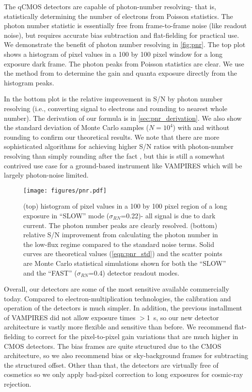 The qCMOS detectors are capable of photon-number resolving- that is, statistically determining the number of electrons from Poisson statistics. The photon number statistic is essentially free from frame-to-frame noise (like readout noise), but requires accurate bias subtraction and flat-fielding for practical use. We demonstrate the benefit of photon number resolving in \autoref{fig:pnr}. The top plot shows a histogram of pixel values in a 100 by 100 pixel window for a long exposure dark frame. The photon peaks from Poisson statistics are clear. We use the method from \citet{starkey_determining_2016} to determine the gain and quanta exposure directly from the histogram peaks. 

In the bottom plot is the relative improvement in S/N by photon number resolving (i.e., converting signal to electrons and rounding to nearest whole number). The derivation of our formula is in \autoref{sec:pnr_derivation}. We also show the standard deviation of Monte Carlo samples ($N=10^4$) with and without rounding to confirm our theoretical results. We note that there are more sophisticated algorithms for achieving higher S/N ratios with photon-number resolving than simply rounding after the fact \citep{harpsoe_bayesian_2012}, but this is still a somewhat contrived use case for a ground-based instrument like VAMPIRES which will be largely photon-noise limited.

\begin{figure}
    \centering
    \texttt{[image: figures/pnr.pdf]}
    \caption{(top) histogram of pixel values in a 100 by 100 pixel region of a long exposure in ``SLOW'' mode ($\sigma_{RN}$=\SI{0.22}{\electron})- all signal is due to dark current. The photon number peaks are clearly resolved. (bottom) relative S/N improvement from calculating the photon number in the low-flux regime compared to the standard noise terms. Solid curves are theoretical values (\autoref{eqn:pnr_std}) and the scatter points are Monte Carlo statistical simulations shown for both the ``SLOW'' and the ``FAST''  ($\sigma_{RN}$=\SI{0.4}{\electron}) detector readout modes.\label{fig:pnr}}
\end{figure}

Overall, our detectors are some of the most sensitive available commercially today. Compared to electron-multiplication technologies, the calibration and operation of the detectors is much simpler. In addition, the previous installment of VAMPIRES did not allow exposure times $>$\SI{1}{s}, so our new detector architecture is vastly more flexible and sensitive than before. We recommend flat-fielding to correct for the pixel-to-pixel gain variations that are much higher in CMOS detectors. The bias frames are quite structured due to the CMOS architecture, so we also recommend bias or sky-background frames for subtracting the structured offset. Other than that, the detectors are virtually free of cosmetics so we only apply bad-pixel correction to long exposures for cosmic-ray rejection.

